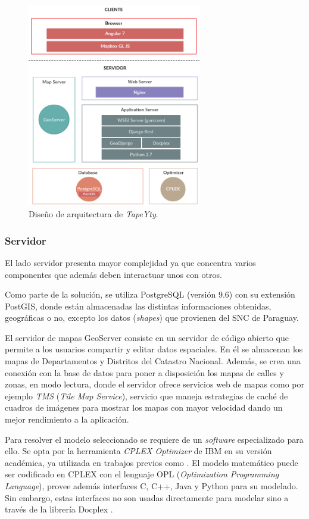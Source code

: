 \documentclass[conference]{IEEEtran}
\begin{document}
\begin{figure}[tbp]
\centerline{\includegraphics[width=7.6cm]{imagenes/20190424_WebAppArchitectureDesign.png}}
\caption{Diseño de arquitectura de \textit{TapeYty}.}
\label{fig:disenhoArquitectura}
\end{figure}

\subsubsection{Servidor}

El lado servidor presenta mayor complejidad ya que concentra varios componentes que además deben interactuar unos con otros.

Como parte de la solución, se utiliza PostgreSQL (versión 9.6) con su extensión PostGIS, donde están almacenadas las distintas informaciones obtenidas, geográficas o no, excepto los datos (\textit{shapes}) que provienen del SNC de Paraguay.

El servidor de mapas GeoServer \cite{GeoServer} consiste en un servidor de código abierto que permite a los usuarios compartir y editar datos espaciales. En él se almacenan los mapas de Departamentos y Distritos del Catastro Nacional. Además, se crea una conexión con la base de datos para poner a disposición los mapas de calles y zonas, en modo lectura, donde el servidor ofrece servicios web de mapas como por ejemplo \textit{TMS} (\textit{Tile Map Service}), servicio que maneja estrategias de caché de cuadros de imágenes para mostrar los mapas con mayor velocidad dando un mejor rendimiento a la aplicación.

Para resolver el modelo seleccionado se requiere de un \textit{software} especializado para ello. Se opta por la herramienta \textit{CPLEX Optimizer} de IBM \cite{CPLEXOptimizer} en su versión académica, ya utilizada en trabajos previos como \cite{Vecchi2016ACollection,Ramos2018TheApproaches,BabaeeTirkolaee2019DevelopingStudy}. El modelo matemático puede ser codificado en CPLEX con el lenguaje OPL ({\textit{Optimization Programming Language}}), provee además interfaces C, C++, Java y Python para su modelado. Sin embargo, estas interfaces no son usadas directamente para modelar sino a través de la librería Docplex \cite{Docplex}.
\end{document}
